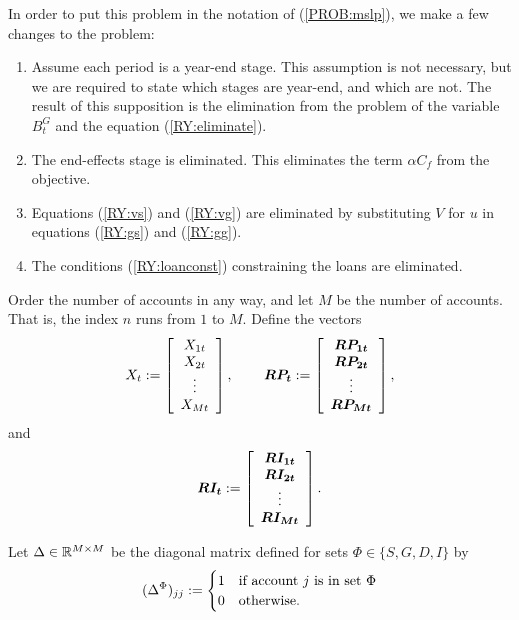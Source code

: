 In order to put this problem in the notation of (\ref{PROB:mslp}), we make a few changes to the problem:
\begin{enumerate}
\item Assume each period is a year-end stage.  This assumption is not necessary, but we are required to state which stages are year-end, and which are not.  The result of this supposition is the elimination from the problem of the variable $B^G_t$ and the equation (\ref{RY:eliminate}).
\item The end-effects stage is eliminated.  This eliminates the term $\alpha C_f$ from the objective.
\item Equations (\ref{RY:vs}) and (\ref{RY:vg}) are eliminated by substituting $V$ for $u$ in equations (\ref{RY:gs}) and (\ref{RY:gg}).
\item The conditions (\ref{RY:loanconst}) constraining the loans are eliminated.
\end{enumerate}

Order the number of accounts in any way, and let $M$ be the number of accounts.  That is, the index $n$ runs from $1$ to $M$.  Define the vectors
\begin{equation*}
X_t := \left[
\begin{array}{c}
	X_{1t}\\
	X_{2t}\\
	\vdots\\
	X_{Mt}
\end{array} \right],
\hspace{0.3in}
\mathbf{\boldsymbol{RP_t}}:=\left[
\begin{array}{c}
	\mathbf{\boldsymbol{RP_{1t}}}\\
	\mathbf{\boldsymbol{RP_{2t}}}\\
	\vdots\\
	\mathbf{\boldsymbol{RP_{Mt}}}
\end{array} \right],
\end{equation*}
and
\begin{equation*}
\mathbf{\boldsymbol{RI_t}}:=\left[
\begin{array}{c}
	\mathbf{\boldsymbol{RI_{1t}}}\\
	\mathbf{\boldsymbol{RI_{2t}}}\\
	\vdots\\
	\mathbf{\boldsymbol{RI_{Mt}}}
\end{array} \right].
\end{equation*}

Let $\Delta \in {\mathbb R}^{M \times M}$ be the diagonal matrix defined for sets \newline $\Phi \in \{S,G,D,I\}$ by
\begin{equation*}
(\Delta^\Phi)_{jj} :=
\begin{cases}
1 & \text{if account $j$ is in set $\Phi$}\\
0 & \text{otherwise}.
\end{cases}
\end{equation*}

